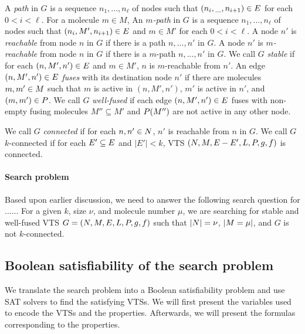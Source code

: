 A {\em path} in $G$ is a sequence $n_1,...,n_\ell$ of nodes 
such that $(n_i,\_,n_{i+1}) \in E$ for each $ 0 < i < \ell$.
%
For a molecule $m \in M$,
An {\em $m$-path} in $G$ is a sequence $n_1,...,n_\ell$ of nodes 
such that $(n_i,M',n_{i+1}) \in E$ and $m \in M'$ for
each $ 0 < i < \ell$.
%
A node $n'$ is {\em reachable} from node $n$ in $G$ if there is a path
$n,...,n'$ in $G$.
%
A node $n'$ is {\em $m$-reachable} from node $n$ in $G$ if there is a
$m$-path $n,...,n'$ in $G$.
%
We call $G$ {\em stable} if for each $(n,M',n') \in E$ and $m \in M'$,
$n$ is $m$-reachable from $n'$.
%
An edge $(n,M',n') \in E$ {\em fuses} with its destination node $n'$
if there are molecules $m,m' \in M$ such that $m$ is active in
$(n,M',n')$, $m'$ is active in $n'$, and $(m,m') \in P$.
%
We call $G$ {\em well-fused} if each edge $(n,M',n') \in E$ fuses
with non-empty fusing molecules $M'' \subseteq M'$
and $P(M'')$ are not active in any other node.



%
We call $G$ {\em connected} if for each $n,n' \in N$,
$n'$ is reachable from $n$ in $G$.
%
We call $G$ $k$-connected if for each $E' \subseteq E$ and $|E'| < k$,
VTS $(N,M,E-E',L,P,g,f)$ is connected.


\paragraph{Search problem}

Based upon earlier discussion, we need to answer the following search
question for ......
For a given $k$, size $\nu$, and molecule number $\mu$,
we are searching for stable and well-fused VTS
$G = (N,M,E,L,P,g,f)$ such that
$|N| = \nu$, $|M = \mu|$, and
$G$ is not $k$-connected.    


\subsection{Boolean satisfiability of the search problem}

We translate the search problem into a Boolean satisfiability
problem and use SAT solvers to find the satisfying VTSs.
%
We will first present the variables used to encode the
VTSs and the properties.
%
Afterwards, we will present the formulas corresponding to the
properties.

